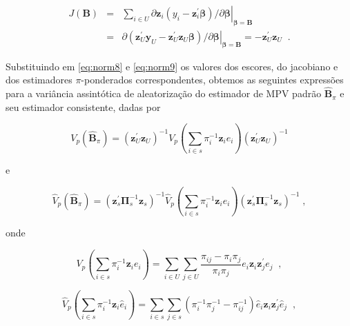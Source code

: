 \documentclass[]{book}
\theoremstyle{definition}
\theoremstyle{definition}
\theoremstyle{definition}
\theoremstyle{remark}
\begin{document}
\begin{eqnarray}
J\left( \mathbf{B}\right) &=&\left. \sum\nolimits_{i\in U}\partial \mathbf{z}
_{i}\left( y_{i}-\mathbf{z}_{i}^{\prime }\mathbf{\beta }\right) /\partial 
\mathbf{\beta }\right| _{\mathbf{\beta }=\mathbf{B}}  \label{eq:norm20} \\
&=&\left. \partial \left( \mathbf{z}_{U}^{\prime }\mathbf{y}_{U}-\mathbf{z}
_{U}^{\prime }\mathbf{z}_{U}\mathbf{\beta }\right) /\partial \mathbf{\beta }
\right| _{\mathbf{\beta }=\mathbf{B}}=-\mathbf{z}_{U}^{\prime }\mathbf{z}
_{U}\;\;.  \nonumber
\end{eqnarray}

Substituindo em \eqref{eq:norm8} e \eqref{eq:norm9} os valores dos escores,
do jacobiano e dos estimadores \(\pi\)-ponderados correspondentes,
obtemos as seguintes expressões para a variância assintótica de
aleatorização do estimador de MPV padrão \(\widehat{\mathbf{B}}_{\pi}\)
e seu estimador consistente, dadas por

\begin{equation}
V_{p}\left( \widehat{\mathbf{B}}_{\pi }\right) =\left( \mathbf{z}
_{U}^{\prime }\mathbf{z}_{U}\right) ^{-1}V_{p}\left( \sum\limits_{i\in s}\pi
_{i}^{-1}\mathbf{z}_{i}e_{i}\right) \left( \mathbf{z}_{U}^{\prime }\mathbf{z}
_{U}\right) ^{-1}  \label{eq:norm21}
\end{equation}

e

\begin{equation}
\hat{V}_{p}\left( \widehat{\mathbf{B}}_{\pi }\right) =\left( \mathbf{z}
_{s}^{\prime }\mathbf{\Pi }_{s}^{-1}\mathbf{z}_{s}\right) ^{-1}\hat{V}
_{p}\left( \sum\limits_{i\in s}\pi _{i}^{-1}\mathbf{z}_{i}e_{i}\right)
\left( \mathbf{z}_{s}^{\prime }\mathbf{\Pi }_{s}^{-1}\mathbf{z}_{s}\right)
^{-1}\;,  \label{eq:norm22}
\end{equation}

onde

\begin{equation}
V_{p}\left( \sum\limits_{i\in s}\pi _{i}^{-1}\mathbf{z}_{i}e_{i}\right)
=\sum\limits_{i\in U}\sum\limits_{j\in U}\frac{\pi _{ij}-\pi _{i}\pi _{j}}{
\pi _{i}\pi _{j}}e_{i}\mathbf{z}_{i}\mathbf{z}_{j}^{\prime }e_{j}\;\;,
\label{eq:norm23}
\end{equation}

\begin{equation}
\hat{V}_{p}\left( \sum\limits_{i\in s}\pi _{i}^{-1}\mathbf{z}_{i}\hat{e}
_{i}\right) =\sum\limits_{i\in s}\sum\limits_{j\in s}\left( \pi _{i}^{-1}\pi
_{j}^{-1}-\pi _{ij}^{-1}\right) \hat{e}_{i}\mathbf{z}_{i}\mathbf{z}
_{j}^{\prime }\hat{e}_{j}\;\;,  \label{eq:norm24}
\end{equation}
\end{document}

